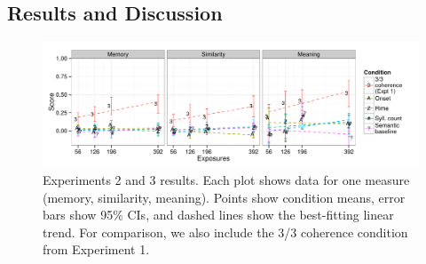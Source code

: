 \documentclass[man,floatsintext]{apa6}
\begin{document}
\subsection{Results and Discussion}

\begin{figure}[t]
  \begin{center}
    \includegraphics[width=1.0\linewidth]{x23.pdf}
    \caption{Experiments 2 and 3 results. Each plot shows data for one
      measure (memory, similarity, meaning). Points show condition means,
      error bars show 95\% CIs, and dashed lines show the best-fitting
      linear trend. For comparison, we also include the 3/3 coherence
      condition from Experiment 1.}
    \label{expt23-results}
  \end{center}
\end{figure}
\end{document}
